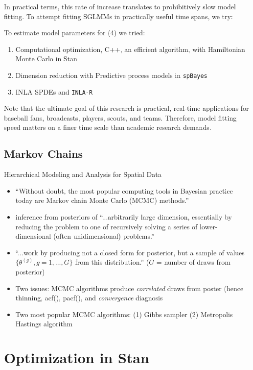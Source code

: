 In practical terms, this rate of increase translates to prohibitively slow model fitting. To attempt fitting SGLMMs in practically useful time spans, we try: 

To estimate model parameters for (4) we tried:
\begin{enumerate}
\item Computational optimization, C++, an efficient algorithm, with Hamiltonian Monte Carlo in Stan
\item Dimension reduction with Predictive process models in \verb|spBayes|
\item INLA SPDEs and \verb|INLA-R|
\end{enumerate}

Note that the ultimate goal of this research is practical, real-time applications for baseball fans, broadcasts, players, scouts, and teams. Therefore, model fitting speed matters on a finer time scale than academic research demands.  

\subsection{Markov Chains}

Hierarchical Modeling and Analysis for Spatial Data \citep{Banerjee2014}
        \begin{itemize} %
        \item ``Without doubt, the most popular computing tools in Bayesian practice today are Markov chain Monte Carlo (MCMC) methods.'' 
        \item inference from posteriors of ``...arbitrarily large dimension, essentially by reducing the problem to one of recursively solving a series of lower-dimensional (often unidimensional) problems.'' 
        \item ``...work by producing not a closed form for posterior, but a sample of values $\{\theta^{(g)}, g = 1, \dots, G\}$ from this distribution.'' ($G$ = number of draws from posterior) 
        \item Two issues: MCMC algorithms produce {\it correlated} draws from poster (hence thinning, acf(), pacf(), and {\it convergence} diagnosis 
        \item Two most popular MCMC algorithms: (1) Gibbs sampler (2) Metropolis Hastings algorithm
        \end{itemize} %

\section{Optimization in Stan} %

